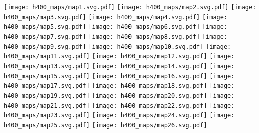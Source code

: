\documentclass{article}
\begin{document}
\noindent
\texttt{[image: h400\_maps/map1.svg.pdf]}
\break
\break
\texttt{[image: h400\_maps/map2.svg.pdf]}
\texttt{[image: h400\_maps/map3.svg.pdf]}
\break
\break
\texttt{[image: h400\_maps/map4.svg.pdf]}
\texttt{[image: h400\_maps/map5.svg.pdf]}
\break
\break
\texttt{[image: h400\_maps/map6.svg.pdf]}
\texttt{[image: h400\_maps/map7.svg.pdf]}
\break
\break
\texttt{[image: h400\_maps/map8.svg.pdf]}
\texttt{[image: h400\_maps/map9.svg.pdf]}
\break
\break
\texttt{[image: h400\_maps/map10.svg.pdf]}
\texttt{[image: h400\_maps/map11.svg.pdf]}
\break
\break
\texttt{[image: h400\_maps/map12.svg.pdf]}
\texttt{[image: h400\_maps/map13.svg.pdf]}
\break
\break
\texttt{[image: h400\_maps/map14.svg.pdf]}
\texttt{[image: h400\_maps/map15.svg.pdf]}
\break
\break
\texttt{[image: h400\_maps/map16.svg.pdf]}
\texttt{[image: h400\_maps/map17.svg.pdf]}
\break
\break
\texttt{[image: h400\_maps/map18.svg.pdf]}
\texttt{[image: h400\_maps/map19.svg.pdf]}
\break
\break
\texttt{[image: h400\_maps/map20.svg.pdf]}
\texttt{[image: h400\_maps/map21.svg.pdf]}
\break
\break
\texttt{[image: h400\_maps/map22.svg.pdf]}
\texttt{[image: h400\_maps/map23.svg.pdf]}
\break
\break
\texttt{[image: h400\_maps/map24.svg.pdf]}
\texttt{[image: h400\_maps/map25.svg.pdf]}
\break
\break
\texttt{[image: h400\_maps/map26.svg.pdf]}
\end{document}
